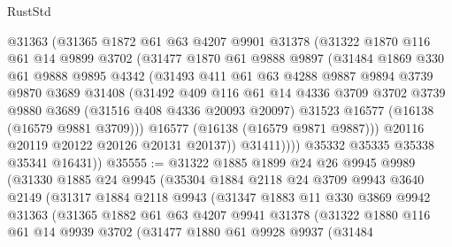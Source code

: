 \begin{lexlean}{RustStd}
\begin{coremodule}
            @31363
            (@31365
              @1872
              @61
              @63
              @4207
              @9901
              @31378
              (@31322
                @1870
                @116
                @61
                @14
                @9899
                @3702
                (@31477
                  @1870
                  @61
                  @9888
                  @9897
                  (@31484
                    @1869
                    @330
                    @61
                    @9888
                    @9895
                    @4342
                    (@31493
                      @411
                      @61
                      @63
                      @4288
                      @9887
                      @9894
                      @3739
                      @9870
                      @3689
                      @31408
                      (@31492
                        @409
                        @116
                        @61
                        @14
                        @4336
                        @3709
                        @3702
                        @3739
                        @9880
                        @3689
                        (@31516 @408 @4336 @20093 @20097)
                        @31523
                        @16577
                        (@16138 (@16579 @9881 @3709)))
                      @16577
                      (@16138 (@16579 @9871 @9887)))
                    @20116
                    @20119
                    @20122
                    @20126
                    @20131
                    @20137))
                @31411))))
        @35332
        @35335
        @35338
        @35341
        @16431))
@35555 := @31322
    @1885
    @1899
    @24
    @26
    @9945
    @9989
    (@31330
      @1885
      @24
      @9945
      (@35304
        @1884
        @2118
        @24
        @3709
        @9943
        @3640
        @2149
        (@31317
          @1884
          @2118
          @9943
          (@31347
            @1883
            @11
            @330
            @3869
            @9942
            @31363
            (@31365
              @1882
              @61
              @63
              @4207
              @9941
              @31378
              (@31322
                @1880
                @116
                @61
                @14
                @9939
                @3702
                (@31477
                  @1880
                  @61
                  @9928
                  @9937
                  (@31484

\end{coremodule}
\end{lexlean}

